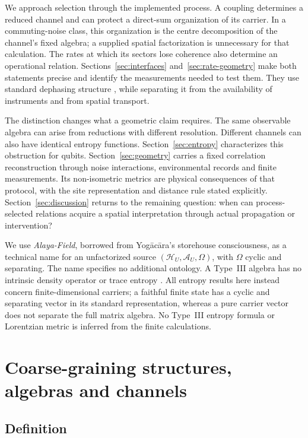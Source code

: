 \documentclass[12pt,a4paper]{article}
\begin{document}
We approach selection through the implemented process. A coupling
determines a reduced channel and can protect a direct-sum organization
of its carrier. In a commuting-noise class, this organization is the
centre decomposition of the channel's fixed algebra; a supplied
spatial factorization is unnecessary for that calculation. The rates
at which its sectors lose coherence also determine an operational
relation. Sections~\ref{sec:interfaces} and~\ref{sec:rate-geometry}
make both statements precise and identify the measurements needed to
test them. They use standard dephasing structure
\cite{Fagnola2019,Liu2026PaperB}, while separating it from the
availability of instruments and from spatial transport.

The distinction changes what a geometric claim requires. The same
observable algebra can arise from reductions with different resolution.
Different channels can also have identical entropy functions.
Section~\ref{sec:entropy} characterizes this obstruction for qubits.
Section~\ref{sec:geometry} carries a fixed correlation reconstruction
through noise interactions, environmental records and finite
measurements. Its non-isometric metrics are physical consequences of
that protocol, with the site representation and distance rule stated
explicitly. Section~\ref{sec:discussion} returns to the remaining
question: when can process-selected relations acquire a spatial
interpretation through actual propagation or intervention?

We use \emph{Alaya-Field}, borrowed from Yog\=ac\=ara's storehouse
consciousness, as a technical name for an unfactorized source
$(\mathcal H_U,\mathcal A_U,\Omega)$, with $\Omega$ cyclic and separating.
The name specifies no additional ontology. A Type~III algebra has no
intrinsic density operator or trace entropy \cite{Haag1996}.
All entropy results here instead concern finite-dimensional carriers;
a faithful finite state has a cyclic and separating vector in its
standard representation, whereas a pure carrier vector does not
separate the full matrix algebra. No Type~III entropy formula or
Lorentzian metric is inferred from the finite calculations.

\section{Coarse-graining structures, algebras and channels}
\label{sec:coarse}

\subsection{Definition}
\end{document}
